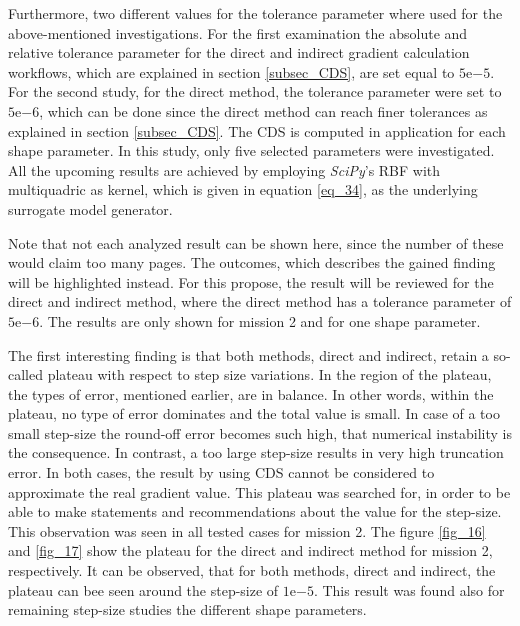 Furthermore, two different values for the tolerance 
parameter where used for the above-mentioned investigations.
For the first examination the absolute 
and relative tolerance parameter \cite{noauthor_numpys_2021} for 
the direct and indirect gradient calculation 
workflows, which are explained in section \ref{subsec_CDS}, 
are set equal to $5\mathrm{e}{-5}$. For the 
second study, for the direct method, the 
tolerance parameter were set to $5\mathrm{e}{-6}$, 
which can be done since the direct method 
can reach finer tolerances as 
explained in section \ref{subsec_CDS}.
The CDS is computed in application for each
shape parameter. In this study, only five 
selected parameters were investigated.
 All the upcoming 
results are achieved by employing \emph{SciPy}'s RBF
with
multiquadric as kernel, which is given 
in equation \eqref{eq_34}, as the underlying 
surrogate model generator. \newline 

Note that not each 
analyzed result can be shown here, since 
the number of these would claim too many pages.
The outcomes, which describes the 
gained finding will be highlighted instead.
For this propose, the result will be
reviewed for the direct and indirect method, where 
the direct method has a tolerance parameter of $5\mathrm{e}{-6}$.
The results are only shown for mission 2
and for one shape parameter.\newline


The first interesting finding is that both 
methods, direct and indirect, 
retain a so-called plateau with 
respect to step size variations.
In the region of the plateau, 
the types of error, mentioned 
earlier, are in balance. In other words, 
within the plateau, no type of 
error dominates and the total value is small.
 In case of 
a too small step-size the round-off 
error becomes such high, that numerical 
instability is the consequence. In contrast,  
a too large step-size results in very 
high truncation error. In both cases, the 
result by using CDS cannot be considered 
to approximate the real gradient value.
This plateau  
was searched for, in order to be able to  
make statements and recommendations about the 
value for the step-size. This observation 
was seen in all tested cases for mission 2.
The figure \ref{fig_16} and \ref{fig_17} 
show the plateau for the direct and 
indirect method for mission 2, respectively.
It can be observed, that for both 
methods, direct and indirect, the  
plateau can bee seen around the 
step-size of $1\mathrm{e}{-5}$. This 
result was found also for 
remaining step-size studies  
the different shape parameters.\newline 

